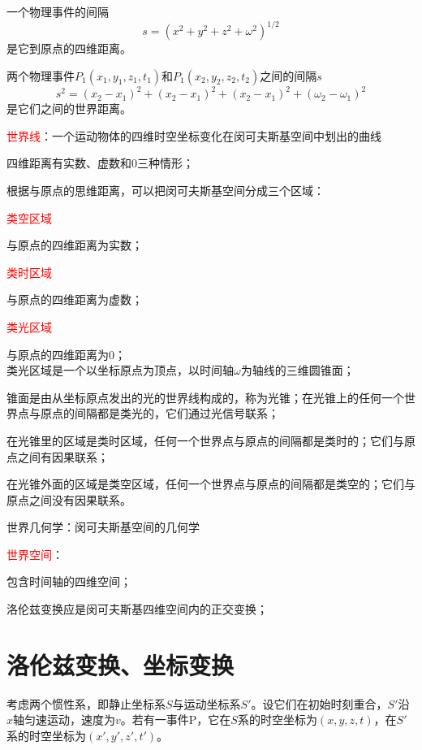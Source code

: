 \documentclass[12pt,a4paper]{article}
\begin{document}
一个物理事件的间隔
\begin{equation}
s = (x^2 +y^2 +z^2 +\omega^2)^{1/2}
\end{equation}
是它到原点的四维距离。

两个物理事件$P_1(x_1,y_1,z_1,t_1)$和$P_1(x_2,y_2,z_2,t_2)$之间的间隔$s$
\begin{equation}
s^2 = (x_2 -x_1)^2 +(x_2 -x_1)^2 +(x_2 -x_1)^2 +(\omega_2 -\omega_1)^2
\end{equation}
是它们之间的世界距离。

\textcolor{red}{世界线}：一个运动物体的四维时空坐标变化在闵可夫斯基空间中划出的曲线


四维距离有实数、虚数和$0$三种情形；

根据与原点的思维距离，可以把闵可夫斯基空间分成三个区域：

\textcolor{red}{类空区域}

与原点的四维距离为实数；

\textcolor{red}{类时区域}

与原点的四维距离为虚数；

\textcolor{red}{类光区域}

与原点的四维距离为$0$；\\

类光区域是一个以坐标原点为顶点，以时间轴$\omega$为轴线的三维圆锥面；

锥面是由从坐标原点发出的光的世界线构成的，称为光锥；在光锥上的任何一个世界点与原点的间隔都是类光的，它们通过光信号联系；

在光锥里的区域是类时区域，任何一个世界点与原点的间隔都是类时的；它们与原点之间有因果联系；

在光锥外面的区域是类空区域，任何一个世界点与原点的间隔都是类空的；它们与原点之间没有因果联系。


世界几何学：闵可夫斯基空间的几何学

\textcolor{red}{世界空间}：

包含时间轴的四维空间；

洛伦兹变换应是闵可夫斯基四维空间内的正交变换；

\section{洛伦兹变换、坐标变换}
考虑两个惯性系，即静止坐标系$S$与运动坐标系$S'$。设它们在初始时刻重合，$S'$沿$x$轴匀速运动，速度为$v$。若有一事件P，它在$S$系的时空坐标为$(x,y,z,t)$，在$S'$系的时空坐标为$(x',y',z',t')$。
\end{document}
